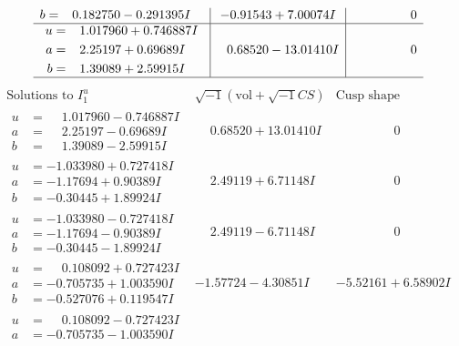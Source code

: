 \documentclass[1p]{elsarticle_modified}
\theoremstyle{definition}
\newcommand{\I}{\sqrt{-1}}
\begin{document}
$$\begin{array}{c|c|c}
\begin{aligned}
b &= \phantom{-}0.182750 - 0.291395 I\end{aligned}
 & -0.91543 + 7.00074 I & \phantom{-0.000000 } 0 \\ \hline\begin{aligned}
u &= \phantom{-}1.017960 + 0.746887 I \\
a &= \phantom{-}2.25197 + 0.69689 I \\
b &= \phantom{-}1.39089 + 2.59915 I\end{aligned}
 & \phantom{-}0.68520 - 13.01410 I & \phantom{-0.000000 } 0\\
 \hline 
 \end{array}$$\newpage$$\begin{array}{c|c|c}  
\text{Solutions to }I^u_{1}& \I (\text{vol} + \sqrt{-1}CS) & \text{Cusp shape}\\
 \hline 
\begin{aligned}
u &= \phantom{-}1.017960 - 0.746887 I \\
a &= \phantom{-}2.25197 - 0.69689 I \\
b &= \phantom{-}1.39089 - 2.59915 I\end{aligned}
 & \phantom{-}0.68520 + 13.01410 I & \phantom{-0.000000 } 0 \\ \hline\begin{aligned}
u &= -1.033980 + 0.727418 I \\
a &= -1.17694 + 0.90389 I \\
b &= -0.30445 + 1.89924 I\end{aligned}
 & \phantom{-}2.49119 + 6.71148 I & \phantom{-0.000000 } 0 \\ \hline\begin{aligned}
u &= -1.033980 - 0.727418 I \\
a &= -1.17694 - 0.90389 I \\
b &= -0.30445 - 1.89924 I\end{aligned}
 & \phantom{-}2.49119 - 6.71148 I & \phantom{-0.000000 } 0 \\ \hline\begin{aligned}
u &= \phantom{-}0.108092 + 0.727423 I \\
a &= -0.705735 + 1.003590 I \\
b &= -0.527076 + 0.119547 I\end{aligned}
 & -1.57724 - 4.30851 I & -5.52161 + 6.58902 I \\ \hline\begin{aligned}
u &= \phantom{-}0.108092 - 0.727423 I \\
a &= -0.705735 - 1.003590 I \\

\end{aligned}
\end{array}$$
\end{document}
